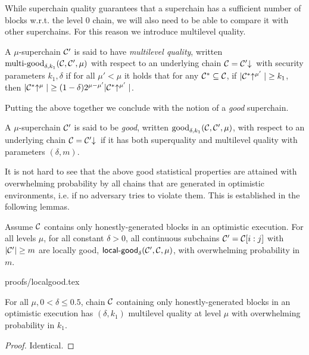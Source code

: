 While superchain quality guarantees that a superchain has a sufficient number
of blocks w.r.t. the level 0 chain, we will also need to be able to compare
it with other superchains. For this reason we introduce multilevel quality.

\begin{definition}
A $\mu$-superchain $\mathcal{C}'$ is said to have \textit{multilevel quality}, written
$\textnormal{multi-good}_{\delta, k_1}(\mathcal{C}, \mathcal{C}', \mu)$ with respect to an
underlying chain $\mathcal{C} = \mathcal{C}'\negthickspace\downarrow\,$ with security parameters $k_1,
\delta$ if for all $\mu' < \mu$ it holds that for any $\mathcal{C}^* \subseteq \mathcal{C}$,
if $|\mathcal{C}^*\negthickspace\uparrow^{\mu'}| \geq k_1$, then $|\mathcal{C}^*\negthickspace\uparrow^{\mu}| \geq (1 -
\delta)2^{\mu - \mu'}|\mathcal{C}^*\negthickspace\uparrow^{\mu'}|$.
\end{definition}


Putting the above together we conclude with the notion of a {\em good} superchain.

\begin{definition}\label{lem.good}
A $\mu$-superchain $\mathcal{C}'$ is said to be \textit{good}, written
$\textnormal{good}_{\delta, k_1}(\mathcal{C}, \mathcal{C}', \mu)$, with respect to an
underlying chain $\mathcal{C} = \mathcal{C}'\negthickspace\downarrow\,$ if it has both superquality and multilevel quality with parameters $(\delta, m)$.
\end{definition}

It is not hard to see that the above good statistical properties are attained
with overwhelming probability by all chains that are generated in optimistic
environments, i.e. if no adversary tries to violate them. This is established in
the following lemmas.

\begin{lemma}
\label{lem.localgood}
Assume $\mathcal{C}$ contains only honestly-generated blocks in an optimistic
execution. For all levels $\mu$, for all constant $\delta > 0$, all continuous
subchains $\mathcal{C}' = \mathcal{C}[i:j]$ with $|\mathcal{C}'| \geq m$ are locally good,
$\textsf{local-good}_{\delta}(\mathcal{C}', \mathcal{C}, \mu)$, with overwhelming
probability in $m$.
\end{lemma}
{proofs/localgood.tex}

\begin{lemma}\label{lem.multilevel}
For all $\mu, 0 < \delta \leq 0.5$, chain $\mathcal{C}$ containing only
honestly-generated blocks in an optimistic execution has $(\delta, k_1)$
multilevel quality at level $\mu$ with overwhelming probability in $k_1$.
\end{lemma}
\begin{proof}
Identical.
\Qed
\end{proof}


